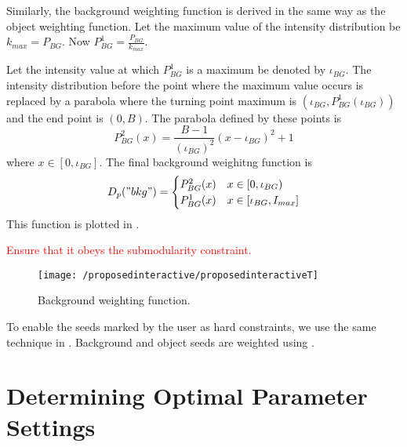 \begin{definition} 
	Similarly, the background weighting function is derived in the same way as the object weighting function. Let the maximum value of the intensity distribution be $k_{max} = P_{BG}$. Now $P_{BG}^{1} = \frac{P_{BG}}{k_{max}}$.
	
	Let the intensity value at which $P_{BG}^{1}$ is a maximum be denoted by $\iota_{BG}$. The intensity distribution before the point where the maximum value occurs is replaced by a parabola where the turning point maximum is $\left(\iota_{BG}, P_{BG}^{1}(\iota_{BG})\right)$ and the end point is $(0,B)$. The parabola defined by these points is 
	\begin{equation}
	P_{BG}^2(x) = \frac{B-1}{(\iota_{BG})^2}(x-\iota_{BG})^2 +1 
	\end{equation}
	where $x \in [0,\iota_{BG}]$.
	The final background weighitng function is
	\begin{equation}
	D_p("bkg") = \begin{cases} 
	P_{BG}^2(x) & x \in [0,\iota_{BG}) \\
	P_{BG}^1(x) & x \in [\iota_{BG},I_{max}]
	\end{cases}
	\end{equation}
	This function is plotted in .
	
	\textcolor{red}{Ensure that it obeys the submodularity constraint.}
	
	\begin{figure}[!h]
		\centering
		\texttt{[image: /proposedinteractive/proposedinteractiveT]}
		\caption{Background weighting function.}
		\label{fig:proposedinteractiveT}
	\end{figure}
\end{definition}

\begin{definition}
	To enable the seeds marked by the user as hard constraints, we use the same technique in \citep{Boykov2001_2}. Background and object seeds are weighted using .
\end{definition}




\section{Determining Optimal Parameter Settings}
\label{sec:optimalparameters}

